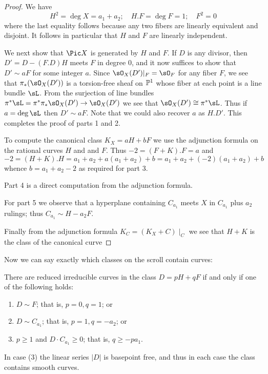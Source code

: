 \begin{proof}
We have 
$$
H^2 = \deg X = a_1+a_2; \quad H.F = \deg F = 1; \quad F^2 = 0
$$
where the last equality follows because any two fibers are linearly equivalent and disjoint.
It follows in particular that $H$ and $F$ are linearly independent.

We next show that $\Pic X$ is generated by $H$ and $F$. If $D$ is any divisor,
then $D' = D - (F.D)H$ meets $F$ in degree 0, and it now suffices to show that $D'\sim aF$ for
some integer $a$.
Since $\sO_X(D')|_F = \sO_F$ for any fiber $F$, we see that
$\pi_*(\sO_X(D'))$ is a torsion-free sheaf on $\PP^1$ whose fiber at each point is a line bundle $\sL$. From the surjection of line bundles $\pi^*\sL = \pi^*\pi_* \sO_X(D') \to \sO_X(D') $
we see that  $\sO_X(D') \cong \pi^*\sL$. Thus if $a = \deg \sL$ then
$D' \sim aF$. Note that we could also recover $a$ as $H.D'$. This completes the proof of parts
1 and 2.

To compute the canonical class $K_X = aH+bF$ we use the adjunction formula on the rational curves
$H$ and and $F$. Thus $-2 = (F+K).F = a $ and 
$$
-2 = (H+K).H = a_1+a_2 + a(a_1+a_2)+b = a_1+a_2 + (-2)(a_1+a_2)+b
$$
whence $b = a_1+a_2-2$ as required for part 3.
 
 Part 4 is a direct computation from the adjunction formula.
 
For part 5 we observe that a hyperplane containing $C_{a_1}$ meets $X$ in $C_{a_1}$ plus
$a_2$ rulings; thus $C_{a_1}\sim H-a_2F$.

Finally from the adjunction formula $K_C = (K_X+C)\mid_C$ we see that $H+K$ is the class of
the canonical curve 
\end{proof}

Now we can say exactly which classes on the scroll contain curves:

\begin{theorem}\label{where are the curves?}
There are reduced irreducible curves in the class $D = pH+qF$ if and only if one of the following holds:
\begin{enumerate}
\item $D\sim F$; that is, $p=0, q=1$; or
 \item $D\sim C_{a_{1}}$; that is, $p=1, q=-a_{2}$; or
 \item $p\geq 1$ and $D\cdot C_{a_{1}}\geq 0$; that is, $q \geq -pa_{1}.$
\end{enumerate}
In case (3) the linear series $|D|$ is basepoint free, and thus in each case the class contains smooth curves.
\end{theorem}

